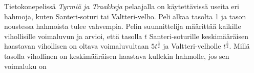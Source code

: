\begin{tehtavasivu}
\begin{tehtava}
Tietokonepelissä \emph{Tyrmiä ja Traakkeja} pelaajalla on käytettävissä useita eri hahmoja,
kuten Santeri-soturi tai Valtteri-velho. Peli alkaa tasolta 1 ja tason noustessa hahmoista
tulee vahvempia. Pelin suunnittelija määrittää kaikille vihollisille voimaluvun ja arvioi,
että tasolla $t$ Santeri-soturille keskimääräisen haastavan vihollisen on oltava
voimaluvultaan $5t^{\frac{3}{2}}$ ja Valtteri-velholle $t^{\frac{5}{2}}$. Millä tasolla
vihollinen on keskimääräisen haastava kullekin hahmolle, jos sen voimaluku on
\begin{alakohdat}
\end{alakohdat}
\begin{vastaus}
\begin{alakohdat}
\end{alakohdat}
\end{vastaus}
\end{tehtava}

\end{tehtavasivu}
